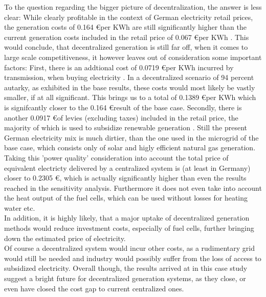 \documentclass[
	11pt,								%
	DIV10,								%
	a4paper,         					%
	oneside,							%
	headheight=20pt,					%
	footheight=20pt,					%
    parskip=full,						%
    listof=totoc,						%
	bibliography=totoc,					%
	index=totoc,						%
]{scrartcl}
\begin{document}
To the question regarding the bigger picture of decentralization, the answer is less clear: While clearly profitable in the context of German electricity retail prices, the generation costs of 0.164 \euro per KWh are still significantly higher than the current generation costs included in the retail price of 0.067 \euro per KWh \cite{bundesnetzagenturMonitoringbericht20182018}. This would conclude, that decentralized generation is still far off, when it comes to large scale competitiveness, it however leaves out of consideration some important factors: First, there is an addtional cost of 0.0719 \euro per KWh incurred by transmission, when buying electricity \cite{bundesnetzagenturMonitoringbericht20182018}. 
In a decentralized scenario of 94 percent autarky, as exhibited in the base results, these costs would most likely be vastly smaller, if at all significant. This brings us to a total of 0.1389 \euro per KWh which is signifcantly closer to the 0.164 \euro result of the base case. Secondly, there is another 0.0917 \euro of levies (excluding taxes) included in the retail price, the majority of which is used to subsidize renewable generation \cite{bundesnetzagenturMonitoringbericht20182018}. Still the present German electricity mix is much dirtier, than the one used in the microgrid of the base case, which consists only of solar and higly efficient natural gas generation. 
Taking this 'power quality' consideration into account the total price of equivalent electricty delivered by a centralized system is (at least in Germany) closer to 0.2305 \euro, which is actually significantly higher than even the results reached in the sensitivity analysis. Furthermore it does not even take into account the heat output of the fuel cells, which can be used without losses for heating water etc. \\
	In addition, it is highly likely, that a major uptake of decentralized generation methods would reduce investment costs, especially of fuel cells, further bringing down the estimated price of electricity. \\
	Of course a decentralized system would incur other costs, as a rudimentary grid would still be needed and industry would possibly suffer from the loss of access to subsidized electricity. 
	Overall though, the results arrived at in this case study suggest a bright future for decentralized generation systems, as they close, or even have closed the cost gap to current centralized ones.

\newpage
{}	
\end{document}
